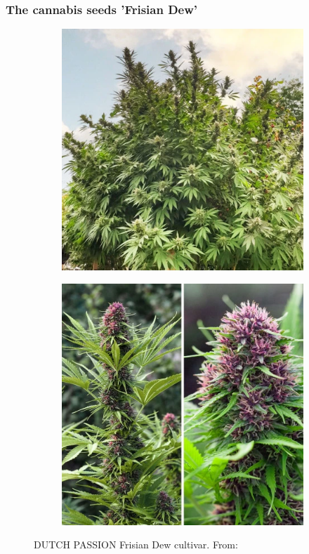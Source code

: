 \documentclass[
    12pt,
    aspectratio=1610,
    bibliography=../bibliography.bib,
    link-citations]{beamer}
\begin{document}
    \begin{frame}
        \frametitle{The cannabis seeds 'Frisian Dew'}
        \begin{figure}
            \begin{subfigure}[t]{.48\textwidth}
                \includegraphics[width=\linewidth]{DUTCH-PASSION_Frisian-Dew_1}
            \end{subfigure}
            \hfill
            \begin{subfigure}[t]{.48\textwidth}
                \includegraphics[width=\linewidth]{DUTCH-PASSION_Frisian-Dew_2}
            \end{subfigure}
            \caption{DUTCH PASSION Frisian Dew cultivar. From: \textcite{noauthor_dutch-passion_frisian-dew_nodate}}
        \end{figure}
    \end{frame}
\end{document}
